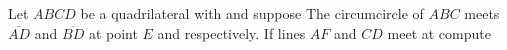 Let $ABCD$ be a quadrilateral with  and suppose   The circumcircle of $ABC$ meets $\overline{AD}$ and $\overline{BD}$ at point $E$ and  respectively. If lines $AF$ and $CD$ meet at  compute 